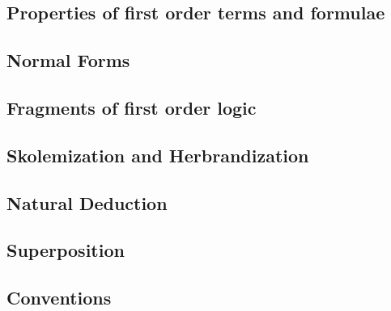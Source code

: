 \subsection{Properties of first order terms and formulae}



\subsection{Normal Forms}



\subsection{Fragments of first order logic}



\subsection{Skolemization and Herbrandization}

\subsection{Natural Deduction}
\label{sec:natural:deduction}


\subsection{Superposition}



\subsection{Conventions}

